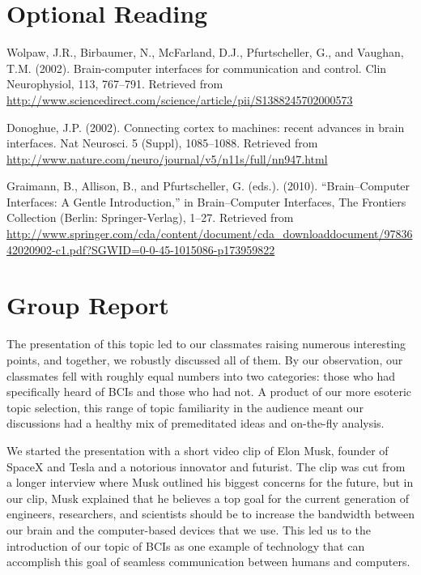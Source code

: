 \documentclass[12pt]{article}
\begin{document}
\section*{Optional Reading}

\begin{enumerate}[leftmargin=0.6cm, label={[\arabic*]}]

\setcounter{enumi}{2}

\item Wolpaw, J.R., Birbaumer, N., McFarland, D.J., Pfurtscheller, G., and Vaughan, T.M. (2002). Brain-computer interfaces for communication and control. Clin Neurophysiol, 113, 767--791. Retrieved from \url{http://www.sciencedirect.com/science/article/pii/S1388245702000573}

\item Donoghue, J.P. (2002). Connecting cortex to machines: recent advances in brain interfaces. Nat Neurosci. 5 (Suppl), 1085--1088. Retrieved from \url{http://www.nature.com/neuro/journal/v5/n11s/full/nn947.html}

\sloppy

\item Graimann, B., Allison, B., and Pfurtscheller, G. (eds.). (2010). “Brain–Computer Interfaces: A Gentle Introduction,” in Brain–Computer Interfaces, The Frontiers Collection (Berlin: Springer-Verlag), 1--27. Retrieved from \url{http://www.springer.com/cda/content/document/cda_downloaddocument/9783642020902-c1.pdf?SGWID=0-0-45-1015086-p173959822}

\end{enumerate}

\newpage

\section*{Group Report}

\doublespacing

The presentation of this topic led to our classmates raising numerous interesting points, and together, we robustly discussed all of them. By our observation, our classmates fell with roughly equal numbers into two categories: those who had specifically heard of BCIs and those who had not. A product of our more esoteric topic selection, this range of topic familiarity in the audience meant our discussions had a healthy mix of premeditated ideas and on-the-fly analysis.

We started the presentation with a short video clip of Elon Musk, founder of SpaceX and Tesla and a notorious innovator and futurist. The clip was cut from a longer interview where Musk outlined his biggest concerns for the future, but in our clip, Musk explained that he believes a top goal for the current generation of engineers, researchers, and scientists should be to increase the bandwidth between our brain and the computer-based devices that we use. This led us to the introduction of our topic of BCIs as one example of technology that can accomplish this goal of seamless communication between humans and computers.
\end{document}
